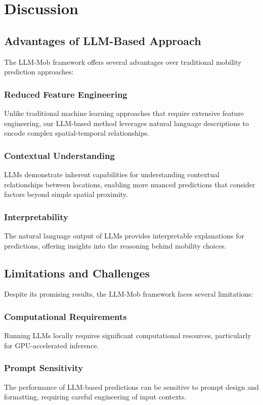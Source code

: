 \documentclass[12pt,a4paper]{article}
\begin{document}
\section{Discussion}

\subsection{Advantages of LLM-Based Approach}

The LLM-Mob framework offers several advantages over traditional mobility prediction approaches:

\subsubsection{Reduced Feature Engineering}
Unlike traditional machine learning approaches that require extensive feature engineering, our LLM-based method leverages natural language descriptions to encode complex spatial-temporal relationships.

\subsubsection{Contextual Understanding}
LLMs demonstrate inherent capabilities for understanding contextual relationships between locations, enabling more nuanced predictions that consider factors beyond simple spatial proximity.

\subsubsection{Interpretability}
The natural language output of LLMs provides interpretable explanations for predictions, offering insights into the reasoning behind mobility choices.

\subsection{Limitations and Challenges}

Despite its promising results, the LLM-Mob framework faces several limitations:

\subsubsection{Computational Requirements}
Running LLMs locally requires significant computational resources, particularly for GPU-accelerated inference.

\subsubsection{Prompt Sensitivity}
The performance of LLM-based predictions can be sensitive to prompt design and formatting, requiring careful engineering of input contexts.
\end{document}
